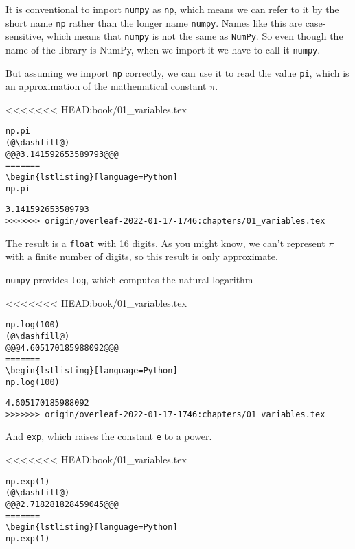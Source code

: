 It is conventional to import \passthrough{\lstinline!numpy!} as
\passthrough{\lstinline!np!}, which means we can refer to it by the
short name \passthrough{\lstinline!np!} rather than the longer name
\passthrough{\lstinline!numpy!}. Names like this are case-sensitive,
which means that \passthrough{\lstinline!numpy!} is not the same as
\passthrough{\lstinline!NumPy!}. So even though the name of the library
is NumPy, when we import it we have to call it
\passthrough{\lstinline!numpy!}.

But assuming we import \passthrough{\lstinline!np!} correctly, we can
use it to read the value \passthrough{\lstinline!pi!}, which is an
approximation of the mathematical constant \(\pi\).

<<<<<<< HEAD:book/01_variables.tex
\begin{lstlisting}[]
np.pi
(@\dashfill@)
@@@3.141592653589793@@@
=======
\begin{lstlisting}[language=Python]
np.pi
\end{lstlisting}

\begin{lstlisting}[]
3.141592653589793
>>>>>>> origin/overleaf-2022-01-17-1746:chapters/01_variables.tex
\end{lstlisting}

The result is a \passthrough{\lstinline!float!} with 16 digits. As you
might know, we can't represent \(\pi\) with a finite number of digits,
so this result is only approximate.

\passthrough{\lstinline!numpy!} provides \passthrough{\lstinline!log!},
which computes the natural logarithm

<<<<<<< HEAD:book/01_variables.tex
\begin{lstlisting}[]
np.log(100)
(@\dashfill@)
@@@4.605170185988092@@@
=======
\begin{lstlisting}[language=Python]
np.log(100)
\end{lstlisting}

\begin{lstlisting}[]
4.605170185988092
>>>>>>> origin/overleaf-2022-01-17-1746:chapters/01_variables.tex
\end{lstlisting}

And \passthrough{\lstinline!exp!}, which raises the constant
\passthrough{\lstinline!e!} to a power.

<<<<<<< HEAD:book/01_variables.tex
\begin{lstlisting}[]
np.exp(1)
(@\dashfill@)
@@@2.718281828459045@@@
=======
\begin{lstlisting}[language=Python]
np.exp(1)
\end{lstlisting}

